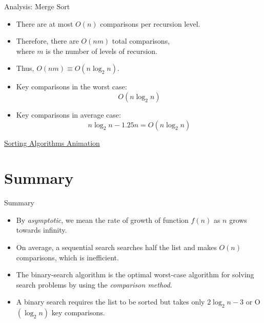 \documentclass[14pt,aspectratio=1610]{beamer}
\begin{document}
\begin{frame}{Analysis: Merge Sort}
\begin{itemize}[<+->]
\item
  There are at most \(O(n)\) comparisons per recursion level.
\item
  Therefore, there are \(O(nm)\) total comparisons, \\where \(m\) is the number of levels of recursion.
\item
  Thus, \(O(nm) \equiv O(n \log_2n)\).

\item
  Key comparisons in the worst case:\\[-1em]
    \begin{equation*}
      O\left(n\log_2n\right)
    \end{equation*}
\item
  Key comparisons in average case:\\[-1em]
    \begin{equation*}
      n\log_2n - 1.25n = O\left(n\log_2n\right)
    \end{equation*}
\end{itemize}
\end{frame}

\begin{frame}{}
\Large\centering{}
\href{https://www.toptal.com/developers/sorting-algorithms}{Sorting Algorithms Animation}
\end{frame}

\section{Summary}
\begin{frame}{Summary}
\begin{itemize}[<+->]
\item
  By \emph{asymptotic}, we mean the rate of growth of function \(f(n)\) as \(n\) grows towards infinity.
\item
  On average, a sequential search searches half the list and makes \(O(n)\) comparisons, which is inefficient.
\item
  The binary-search algorithm is the optimal worst-case algorithm for solving search problems by using the \textit{comparison method}.
\item
  A binary search requires the list to be sorted but takes only \(2\log_2n - 3\) or O\((\log_2n)\) key comparisons.
\end{itemize}
\end{frame}
\end{document}
